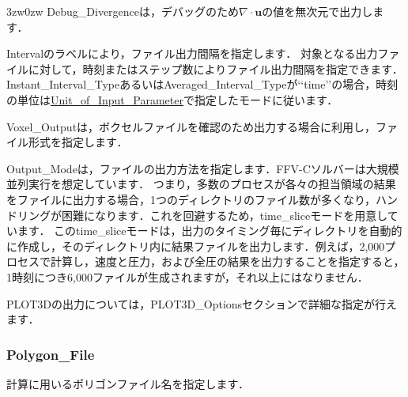\begin{indentation}{3zw}{0zw}
Debug\_Divergenceは，デバッグのため$\nabla \cdot \bm{u}$の値を無次元で出力します．

Intervalのラベルにより，ファイル出力間隔を指定します．
対象となる出力ファイルに対して，時刻またはステップ数によりファイル出力間隔を指定できます．
Instant\_Interval\_TypeあるいはAveraged\_Interval\_Typeが\lq\lq time\rq\rq の場合，時刻の単位は\hyperlink{tgt:unit}{Unit\_of\_Input\_Parameter}で指定したモードに従います．

Voxel\_Outputは，ボクセルファイルを確認のため出力する場合に利用し，ファイル形式を指定します．

Output\_Modeは，ファイルの出力方法を指定します．FFV-Cソルバーは大規模並列実行を想定しています．
つまり，多数のプロセスが各々の担当領域の結果をファイルに出力する場合，1つのディレクトリのファイル数が多くなり，ハンドリングが困難になります．これを回避するため，time\_sliceモードを用意しています．
このtime\_sliceモードは，出力のタイミング毎にディレクトリを自動的に作成し，そのディレクトリ内に結果ファイルを出力します．例えば，2,000プロセスで計算し，速度と圧力，および全圧の結果を出力することを指定すると，1時刻につき6,000ファイルが生成されますが，それ以上にはなりません．

PLOT3Dの出力については，PLOT3D\_Optionsセクションで詳細な指定が行えます．

\end{indentation}



\pagebreak
\subsubsection{Polygon\_File}
計算に用いる\hypertarget{tgt:poly_file_name}{ポリゴンファイル名}を指定します．

